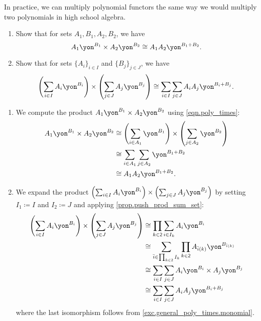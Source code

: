 \documentclass[Book-Poly]{subfiles}
\begin{document}
In practice, we can multiply polynomial functors the same way we would multiply two polynomials in high school algebra.

\begin{exercise} \label{exc.general_poly_times}
\begin{enumerate}
    \item \label{exc.general_poly_times.monomial} Show that for sets $A_1, B_1, A_2, B_2$, we have
    \[
        A_1\yon^{B_1} \times A_2\yon^{B_2} \iso A_1 A_2\yon^{B_1 + B_2}.
    \]
    \item \label{exc.general_poly_times.polynomial} Show that for sets $\{A_i\}_{i \in I}$ and $\{B_j\}_{j \in J}$, we have
    \[
        \left(\sum_{i \in I} A_i\yon^{B_i}\right) \times \left(\sum_{j \in J} A_j\yon^{B_j}\right) \iso \sum_{i \in I} \sum_{j \in J} A_i A_j \yon^{B_i + B_j}.
    \]
\end{enumerate}
\begin{solution}
\begin{enumerate}
    \item We compute the product $A_1\yon^{B_1} \times A_2\yon^{B_2}$ using \eqref{eqn.poly_times}:
    \begin{align*}
        A_1\yon^{B_1} \times A_2\yon^{B_2} &\iso \left(\sum_{i \in A_1} \yon^{B_1}\right) \times \left(\sum_{j \in A_2} \yon^{B_2}\right) \\
        &\iso \sum_{i \in A_1} \sum_{j \in A_2} \yon^{B_1 + B_2} \\
        &\iso A_1 A_2\yon^{B_1 + B_2}.
    \end{align*}

    \item We expand the product $\left(\sum_{i \in I} A_i\yon^{B_i}\right) \times \left(\sum_{j \in J} A_j\yon^{B_j}\right)$ by setting $I_1 \coloneqq I$ and $I_2 \coloneqq J$ and applying \cref{prop.push_prod_sum_set}:
    \begin{align*}
        \left(\sum_{i \in I} A_i\yon^{B_i}\right) \times \left(\sum_{j \in J} A_j\yon^{B_j}\right) &\iso \prod_{k \in \2} \sum_{i \in I_k} A_i\yon^{B_i} \\
        &\iso \sum_{\bar{i} \in \prod_{k \in \2} I_k} \prod_{k \in \2} A_{\bar{i}(k)}\yon^{B_{\bar{i}(k)}} \\
        &\iso \sum_{i \in I} \sum_{j \in J} A_i\yon^{B_i} \times A_j\yon^{B_j} \\
        &\iso \sum_{i \in I} \sum_{j \in J} A_i A_j \yon^{B_i + B_j}
    \end{align*}
    where the last isomorphism follows from \cref{exc.general_poly_times.monomial}.
\end{enumerate}
\end{solution}
\end{exercise}
\end{document}
